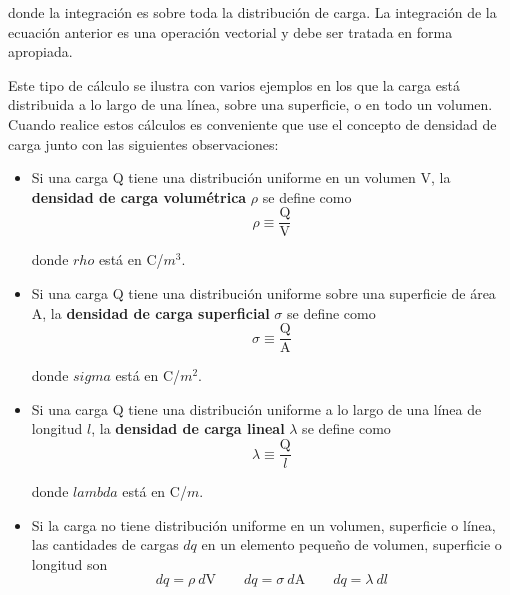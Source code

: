     \PN donde la integración es sobre toda la distribución de carga. La integración de la ecuación anterior es una
    operación vectorial y debe ser tratada en forma apropiada.

    \VS
    \PN Este tipo de cálculo se ilustra con varios ejemplos en los que la carga está distribuida a lo largo de una
    línea, sobre una superficie, o en todo un volumen. Cuando realice estos cálculos es conveniente que use el concepto
    de densidad de carga junto con las siguientes observaciones:
    \begin{itemize}
      \item Si una carga Q tiene una distribución uniforme en un volumen V, la \textbf{densidad de carga volumétrica}
      $\rho$ se define como
      \begin{equation*}
        \rho \equiv \frac{\text{Q}}{\text{V}}
      \end{equation*}

      \PN donde $rho$ está en C/$m^{3}$.

      \item Si una carga Q tiene una distribución uniforme sobre una superficie de área A, la \textbf{densidad de carga
      superficial} $\sigma$ se define como
      \begin{equation*}
        \sigma \equiv \frac{\text{Q}}{\text{A}}
      \end{equation*}

      \PN donde $sigma$ está en C/$m^{2}$.

      \item Si una carga Q tiene una distribución uniforme a lo largo de una línea de longitud $l$, la \textbf{densidad
      de carga lineal} $\lambda$ se define como
      \begin{equation*}
        \lambda \equiv \frac{\text{Q}}{l}
      \end{equation*}

      \PN donde $lambda$ está en C/$m$.

      \item Si la carga no tiene distribución uniforme en un volumen, superficie o línea, las cantidades de cargas $dq$
      en un elemento pequeño de volumen, superficie o longitud son
      \begin{equation*}
        dq = \rho \ d \text{V} \qquad dq = \sigma \ d \text{A} \qquad dq = \lambda \ dl
      \end{equation*}
    \end{itemize}

